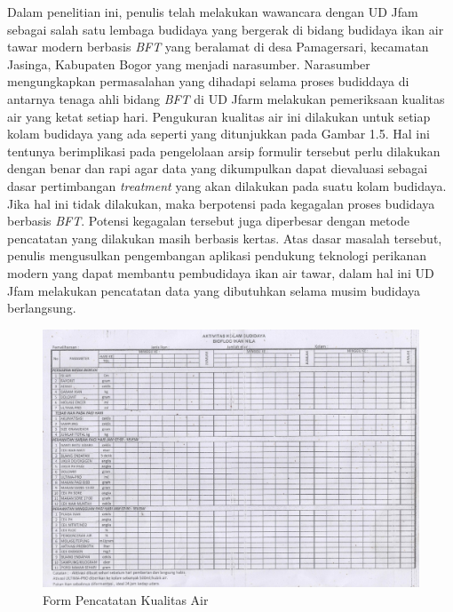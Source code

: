 Dalam penelitian ini, penulis telah melakukan wawancara dengan UD Jfam sebagai salah satu lembaga budidaya yang bergerak di bidang budidaya ikan air tawar modern berbasis \textit{BFT} yang beralamat di desa Pamagersari, kecamatan Jasinga, Kabupaten Bogor yang menjadi narasumber. Narasumber mengungkapkan permasalahan yang dihadapi selama proses budiddaya di antarnya tenaga ahli bidang \textit{BFT} di UD Jfarm melakukan pemeriksaan kualitas air yang ketat setiap hari. Pengukuran kualitas air ini dilakukan untuk setiap kolam budidaya yang ada seperti yang ditunjukkan pada Gambar 1.5. Hal ini tentunya berimplikasi pada pengelolaan arsip formulir tersebut perlu dilakukan dengan benar dan rapi agar data yang dikumpulkan dapat dievaluasi sebagai dasar pertimbangan \textit{treatment} yang akan dilakukan pada suatu kolam budidaya. Jika hal ini tidak dilakukan, maka berpotensi pada kegagalan proses budidaya berbasis \textit{BFT}. Potensi kegagalan tersebut juga diperbesar dengan metode pencatatan yang dilakukan masih berbasis kertas. Atas dasar masalah tersebut, penulis mengusulkan pengembangan aplikasi pendukung teknologi perikanan modern yang dapat membantu pembudidaya ikan air tawar, dalam hal ini UD Jfam melakukan pencatatan data yang dibutuhkan selama musim budidaya berlangsung.

\begin{figure}[H]
	\centering
	\includegraphics[keepaspectratio, width=14cm]{gambar/form_pencatatan_manual}
	\caption{Form Pencatatan Kualitas Air}
	\label{gambar:form_pencatatan_manual}
\end{figure}

